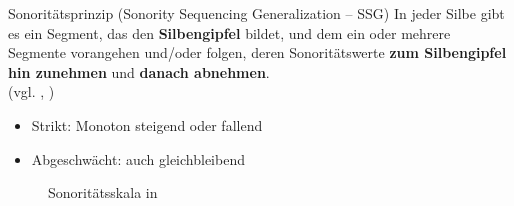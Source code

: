 \begin{frame}


\begin{block}{Sonoritätsprinzip (Sonority Sequencing Generalization -- SSG)}
In jeder Silbe gibt es ein Segment, das den \textbf{Silbengipfel} bildet, und dem ein oder mehrere Segmente vorangehen und/oder folgen, deren Sonoritätswerte \textbf{zum Silbengipfel hin zunehmen} und \textbf{danach abnehmen}.\\
\hfill (vgl. \citealt[225]{Hall00a}, \citealt[94]{Ramers08a})
\end{block}

\begin{itemize}
	\item Strikt: Monoton steigend oder fallend
	\item Abgeschwächt: auch gleichbleibend \citep[vgl.][]{Hall00a}

\end{itemize}


\begin{figure}
	\centering
	\caption{Sonoritätsskala in \citet[19]{Lenerz85a}} %
\end{figure}


\end{frame}


